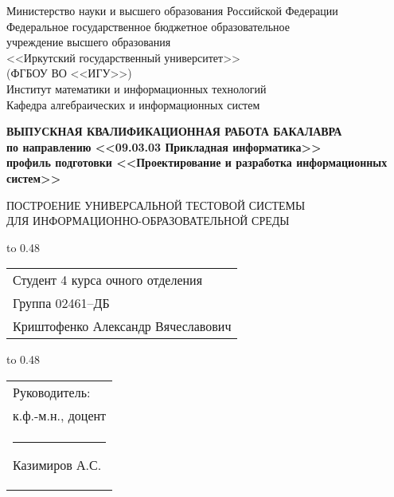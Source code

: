 \thispagestyle{empty}
\begin{center}
Министерство науки и высшего образования Российской Федерации\\
Федеральное государственное бюджетное образовательное\\
учреждение высшего образования\\
<<Иркутский государственный университет>>\\
(ФГБОУ ВО <<ИГУ>>)\\
Институт математики и информационных технологий\\
Кафедра алгебраических и информационных систем\\
\end{center}

\vspace{1.7cm}

\begin{center}
{\bf 
ВЫПУСКНАЯ КВАЛИФИКАЦИОННАЯ РАБОТА
БАКАЛАВРА\\[1mm]
по направлению <<09.03.03 Прикладная информатика>>\\[1mm]
профиль подготовки <<Проектирование и разработка информационных систем>>
}  

\vspace{0.9cm}

{
ПОСТРОЕНИЕ УНИВЕРСАЛЬНОЙ 
ТЕСТОВОЙ СИСТЕМЫ\\[1mm]
ДЛЯ ИНФОРМАЦИОННО-ОБРАЗОВАТЕЛЬНОЙ СРЕДЫ 
} %
\end{center}

\vspace{1.3cm}

{
\noindent\hbox to 0.48\textwidth {%
	\mbox{ } \hfil} %
	\begin{tabular}[t]{l}
		Студент 4 курса очного отделения\\
		Группа 02461--ДБ\\
		Криштофенко Александр 
		Вячеславович		
	\end{tabular}		
}

\vspace{0.5cm}

{
	\noindent\hbox to 0.48\textwidth {%
		\mbox{ } \hfil} %
	\begin{tabular}[t]{l}
		Руководитель:\\ к.ф.-м.н., доцент\\
		\rule{2.7cm}{0.5pt} Казимиров А.С.		
	\end{tabular}		
}

\vspace{0.5cm}

